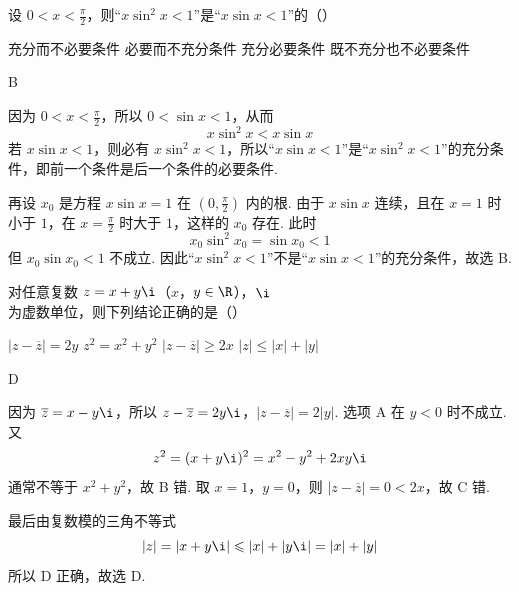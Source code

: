 \begin{problem}
设 \(0 < x < \frac{\pi}{2}\)，则“\(x \sin^2 x < 1\)”是“\(x \sin x < 1\)”的（\quad）

\choices
    {充分而不必要条件}
    {必要而不充分条件}
    {充分必要条件}
    {既不充分也不必要条件}
\begin{answer}
B
\end{answer}

\begin{solution}
因为 \(0<x<\frac{\pi}{2}\)，所以 \(0<\sin x<1\)，从而
\[
x\sin^2x<x\sin x
\]
若 \(x\sin x<1\)，则必有 \(x\sin^2x<1\)，所以“\(x\sin x<1\)”是“\(x\sin^2x<1\)”的充分条件，即前一个条件是后一个条件的必要条件.

再设 \(x_0\) 是方程 \(x\sin x=1\) 在 \((0,\frac\pi2)\) 内的根. 由于 \(x\sin x\) 连续，且在 \(x=1\) 时小于 \(1\)，在 \(x=\frac\pi2\) 时大于 \(1\)，这样的 \(x_0\) 存在. 此时
\[
x_0\sin^2x_0=\sin x_0<1
\]
但 \(x_0\sin x_0<1\) 不成立. 因此“\(x\sin^2x<1\)”不是“\(x\sin x<1\)”的充分条件，故选 B.
\end{solution}
\end{problem}

\begin{problem}
对任意复数 \(z = x + y\i\)（\(x\)，\(y \in \R\)），\(\i\) 为虚数单位，则下列结论正确的是（\quad）

\choices
    {\(|z - \overline{z}| = 2y\)}
    {\(z^2 = x^2 + y^2\)}
    {\(|z - \overline{z}| \geqslant 2x\)}
    {\(|z|\leqslant |x| + |y|\)}
\begin{answer}
D
\end{answer}

\begin{solution}
因为 \(\overline z=x-y\i\)，所以
\(z-\overline z=2y\i\)，\(|z-\overline z|=2|y|\).
选项 A 在 \(y<0\) 时不成立. 又
\[
z^2=(x+y\i)^2=x^2-y^2+2xy\i
\]
通常不等于 \(x^2+y^2\)，故 B 错. 取 \(x=1\)，\(y=0\)，则 \(|z-\overline z|=0<2x\)，故 C 错.

最后由复数模的三角不等式
\[
|z|=|x+y\i|\leqslant |x|+|y\i|=|x|+|y|
\]
所以 D 正确，故选 D.
\end{solution}
\end{problem}


